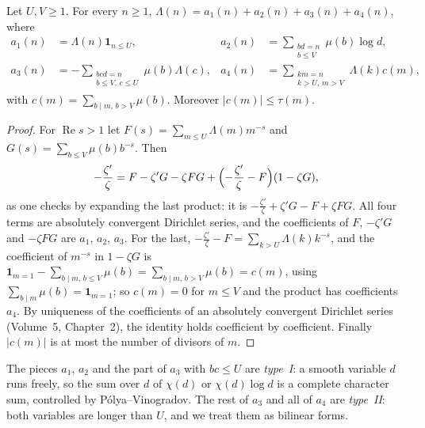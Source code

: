 \begin{lemma}[Vaughan, 1977]\label{lem:vaughan}
Let $U,V\ge1$. For every $n\ge1$, $\Lambda(n)=a_1(n)+a_2(n)+a_3(n)+a_4(n)$, where
\[
\begin{aligned}
a_1(n)&=\Lambda(n)\mathbf 1_{n\le U},& a_2(n)&=\sum_{\substack{bd=n\\b\le V}}\mu(b)\log d,\\
a_3(n)&=-\sum_{\substack{bcd=n\\b\le V,\,c\le U}}\mu(b)\Lambda(c),& a_4(n)&=\sum_{\substack{km=n\\k>U,\,m>V}}\Lambda(k)c(m),
\end{aligned}
\]
with $c(m)=\sum_{b\mid m,\,b>V}\mu(b)$. Moreover $|c(m)|\le\tau(m)$.
\end{lemma}
\begin{proof}
For $\operatorname{Re}s>1$ let $F(s)=\sum_{m\le U}\Lambda(m)m^{-s}$ and $G(s)=\sum_{b\le V}\mu(b)b^{-s}$. Then
\[
-\frac{\zeta'}\zeta=F-\zeta'G-\zeta FG+\Bigl(-\frac{\zeta'}\zeta-F\Bigr)(1-\zeta G),
\]
as one checks by expanding the last product: it is $-\frac{\zeta'}\zeta+\zeta'G-F+\zeta FG$. All four terms are absolutely convergent Dirichlet series, and the coefficients of $F$, $-\zeta'G$ and $-\zeta FG$ are $a_1$, $a_2$, $a_3$. For the last, $-\frac{\zeta'}\zeta-F=\sum_{k>U}\Lambda(k)k^{-s}$, and the coefficient of $m^{-s}$ in $1-\zeta G$ is $\mathbf 1_{m=1}-\sum_{b\mid m,\,b\le V}\mu(b)=\sum_{b\mid m,\,b>V}\mu(b)=c(m)$, using $\sum_{b\mid m}\mu(b)=\mathbf 1_{m=1}$; so $c(m)=0$ for $m\le V$ and the product has coefficients $a_4$. By uniqueness of the coefficients of an absolutely convergent Dirichlet series (Volume~5, Chapter~2), the identity holds coefficient by coefficient. Finally $|c(m)|$ is at most the number of divisors of $m$.
\end{proof}

The pieces $a_1$, $a_2$ and the part of $a_3$ with $bc\le U$ are \emph{type~I}: a smooth variable $d$ runs freely, so the sum over $d$ of $\chi(d)$ or $\chi(d)\log d$ is a complete character sum, controlled by Pólya--Vinogradov. The rest of $a_3$ and all of $a_4$ are \emph{type~II}: both variables are longer than $U$, and we treat them as bilinear forms.

